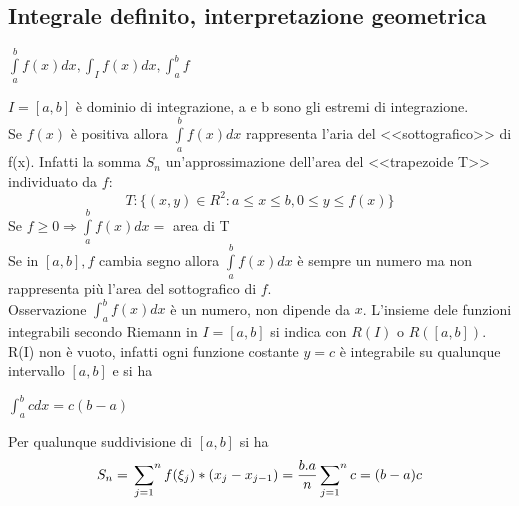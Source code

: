 \documentclass{book}
\begin{document}
\subsection{Integrale definito, interpretazione geometrica}
\begin{center}
	$\int\limits^b_af(x)dx, \int_If(x)dx,\int^b_af$
\end{center}
$I=[a,b]$ è dominio di integrazione, a e b sono gli estremi di integrazione.\\
Se $f(x)$ è positiva allora $\int\limits^b_a f(x)dx$ rappresenta l'aria del <<sottografico>> di f(x). Infatti la somma $S_n$ un'approssimazione dell'area del <<trapezoide T>> individuato da $f$:
\begin{equation*}
	T: \{(x,y)\in R^2: a\leq x\leq b, 0\leq y\leq f(x)\}
\end{equation*}
Se $f\geq 0\Rightarrow \int\limits_a^b f(x)dx=$ area di T\\
Se in $[a,b], f$ cambia segno allora $\int\limits^b_a f(x)dx$ è sempre un numero ma non rappresenta più l'area del sottografico di $f$.\\
Osservazione $\int^b_af(x)dx$ è un numero, non dipende da $x$. L'insieme dele funzioni integrabili secondo Riemann in $I=[a,b]$ si indica con $R(I)$ o $R([a,b])$.\\
R(I) non è vuoto, infatti ogni funzione costante $y=c$ è integrabile su qualunque intervallo $[a,b]$ e si ha
\begin{center}
	$\int^b_a c dx=c(b-a)$
\end{center}
Per qualunque suddivisione di $[a,b]$ si ha
\begin{equation*}
	S_n=\sideset{}{^n}\sum_{j=1}f(\xi_j)*(x_j-x_{j-1})=\frac{b.a}{n}\sideset{}{^n}\sum_{j=1}c=(b-a)c
\end{equation*}
\end{document}
